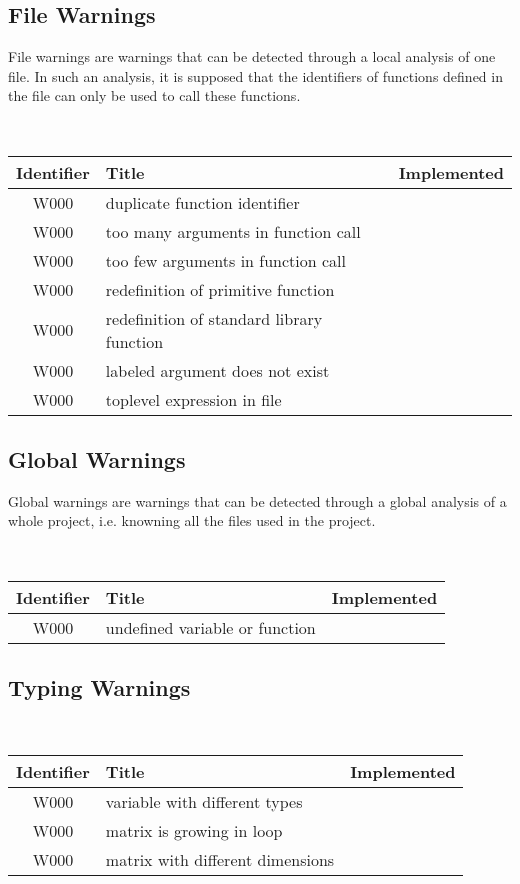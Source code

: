 \subsection{File Warnings}

File warnings are warnings that can be detected through a local
analysis of one file. In such an analysis, it is supposed that the
identifiers of functions defined in the file can only be used to call
these functions.

\noindent\\\begin{tabular}{|c|p{8cm}|c|} \hline
Identifier & Title & Implemented      \\ \hline
W000 & duplicate function identifier &  \\ \hline
W000 & too many arguments in function call &  \\ \hline
W000 & too few arguments in function call  &  \\ \hline
W000 & redefinition of primitive function &  \\ \hline
W000 & redefinition of standard library function &  \\ \hline
W000 & labeled argument does not exist &  \\ \hline
W000 & toplevel expression in file &  \\ \hline
\end{tabular}

\subsection{Global Warnings}

Global warnings are warnings that can be detected through a global
analysis of a whole project, i.e. knowning all the files used in the
project.

\noindent\\\begin{tabular}{|c|p{8cm}|c|} \hline
Identifier & Title & Implemented      \\ \hline
W000 & undefined variable or function &  \\ \hline
\end{tabular}

\subsection{Typing Warnings}



\noindent\\\begin{tabular}{|c|p{8cm}|c|} \hline
Identifier & Title & Implemented      \\ \hline
W000 & variable with different types &  \\ \hline
W000 & matrix is growing in loop &  \\ \hline
W000 & matrix with different dimensions &  \\ \hline
\end{tabular}

